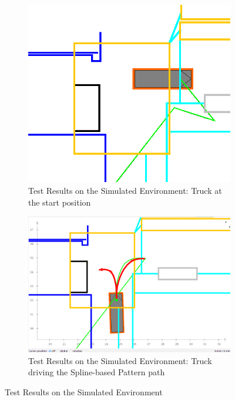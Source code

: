 \begin{figure}[H]
    \centering
    \begin{subfigure}[b]{0.45\textwidth}
        \centering
        \includegraphics[width=\textwidth]{images/Chap3/Start_neksa.png}
        \caption{Test Results on the Simulated Environment: Truck at the start position}
        \label{fig:start}
    \end{subfigure}
    \hfill
    \begin{subfigure}[b]{0.45\textwidth}
        \centering
        \includegraphics[width=\textwidth]{images/Chap2/Pattern_spline_simulation_3_driving.png}
        \caption{Test Results on the Simulated Environment: Truck driving the Spline-based Pattern path}
        \label{fig:spline}
    \end{subfigure}
    \caption{Test Results on the Simulated Environment}
    \label{TestResults}
\end{figure}

